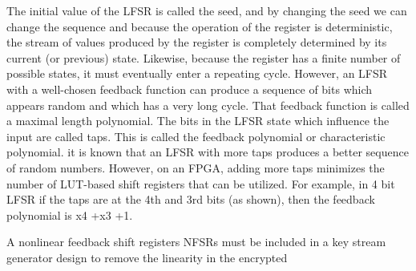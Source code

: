 
The initial value of the LFSR is called the seed, and by changing the seed we can change the sequence and because the operation of the register is deterministic, the stream of values produced by the register is completely determined by its current (or previous) state. Likewise, because the register has a finite number of possible states, it must eventually enter a repeating cycle. However, an LFSR with a well-chosen feedback function can produce a sequence of bits which appears random and which has a very long cycle. That feedback function is called a maximal length polynomial. The bits in the LFSR state which influence the input are called taps. This is called the feedback polynomial or characteristic polynomial. it is known that an LFSR with more taps produces a better sequence of random numbers. However, on an FPGA, adding more taps minimizes the number of LUT-based shift registers that can be utilized. For example, in 4 bit LFSR if the taps are at the 4th and 3rd bits (as shown), then the feedback polynomial is x4 +x3 +1. 

A nonlinear feedback shift registers NFSRs must be included in a key stream generator design to remove the linearity in the encrypted